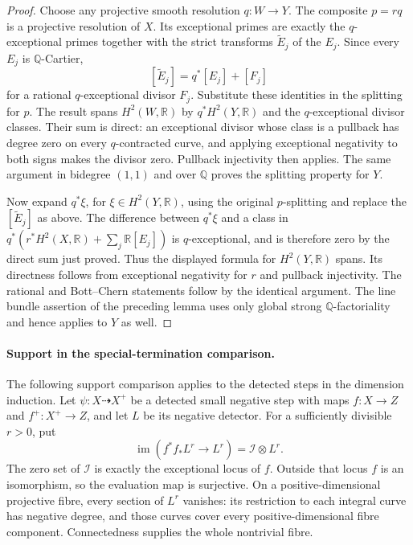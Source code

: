\begin{proof}
Choose any projective smooth resolution $q:W\to Y$. The composite
$p=rq$ is a projective resolution of $X$. Its exceptional primes are
exactly the $q$-exceptional primes together with the strict transforms
$\widetilde E_j$ of the $E_j$. Since every $E_j$ is $\mathbb Q$-Cartier,
\[
 [\widetilde E_j]=q^*[E_j]+[F_j]
\]
for a rational $q$-exceptional divisor $F_j$. Substitute these identities
in the splitting for $p$. The result spans $H^2(W,\mathbb R)$ by
$q^*H^2(Y,\mathbb R)$ and the $q$-exceptional divisor classes. Their sum
is direct: an exceptional divisor whose class is a pullback has degree
zero on every $q$-contracted curve, and applying exceptional negativity
to both signs makes the divisor zero. Pullback injectivity then applies.
The same argument in bidegree $(1,1)$ and over $\mathbb Q$ proves the
splitting property for $Y$.

Now expand $q^*\xi$, for $\xi\in H^2(Y,\mathbb R)$, using the original
$p$-splitting and replace the $[\widetilde E_j]$ as above. The difference
between $q^*\xi$ and a class in
$q^*(r^*H^2(X,\mathbb R)+\sum_j\mathbb R[E_j])$ is $q$-exceptional,
and is therefore zero by the direct sum just proved. Thus the displayed
formula for $H^2(Y,\mathbb R)$ spans. Its directness follows from
exceptional negativity for $r$ and pullback injectivity. The rational
and Bott--Chern statements follow by the identical argument. The line
bundle assertion of the preceding lemma uses only global strong
$\mathbb Q$-factoriality and hence applies to $Y$ as well.
\end{proof}



\paragraph{Support in the special-termination comparison.}
\label{prog:special-support}
The following support comparison applies to the detected steps in
the dimension induction. Let $\psi:X\dashrightarrow X^+$ be a detected
small negative step with maps $f:X\to Z$ and $f^+:X^+\to Z$,
and let $L$ be its negative detector. For a sufficiently
divisible $r>0$, put
\[
 \operatorname{im}(f^*f_*L^r\longrightarrow L^r)
      =\mathcal I\otimes L^r.
\]
The zero set of $\mathcal I$ is exactly the exceptional locus of $f$.
Outside that locus $f$ is an isomorphism, so the evaluation map is
surjective. On a positive-dimensional projective fibre, every section
of $L^r$ vanishes: its restriction to each integral curve has negative
degree, and those curves cover every positive-dimensional fibre
component. Connectedness supplies the whole nontrivial fibre.

